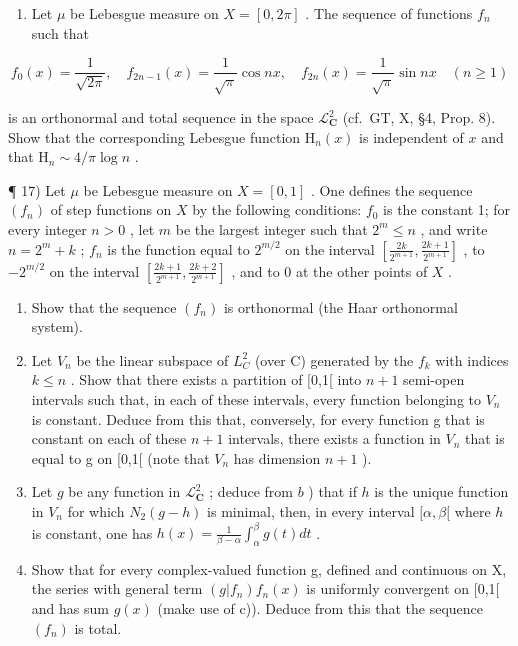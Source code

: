 \begin{enumerate}
\def\labelenumi{\arabic{enumi})}
\setcounter{enumi}{15}
\tightlist
\item
  Let \(\mu\) be Lebesgue measure on \(X = [0, 2\pi]\) . The sequence of functions \(f_n\) such that
\end{enumerate}

\[
f _ {0} (x) = \frac {1}{\sqrt {2 \pi}}, \quad f _ {2 n - 1} (x) = \frac {1}{\sqrt {\pi}} \cos n x, \quad f _ {2 n} (x) = \frac {1}{\sqrt {\pi}} \sin n x \quad (n \geqslant 1)
\]

is an orthonormal and total sequence in the space \(\mathcal{L}_{\mathbf{C}}^{2}\) (cf.~GT, X, §4, Prop. 8). Show that the corresponding Lebesgue function \(\mathrm{H}_n(x)\) is independent of \(x\) and that \(\mathrm{H}_n \sim 4 / \pi \log n\) .

¶ 17) Let \(\mu\) be Lebesgue measure on \(X = [0,1]\) . One defines the sequence \((f_n)\) of step functions on \(X\) by the following conditions: \(f_0\) is the constant 1; for every integer \(n > 0\) , let \(m\) be the largest integer such that \(2^m \leqslant n\) , and write \(n = 2^m + k\) ; \(f_n\) is the function equal to \(2^{m/2}\) on the interval \(\left[\frac{2k}{2^{m+1}}, \frac{2k+1}{2^{m+1}}\right]\) , to \(-2^{m/2}\) on the interval \(\left[\frac{2k+1}{2^{m+1}}, \frac{2k+2}{2^{m+1}}\right]\) , and to 0 at the other points of \(X\) .

\begin{enumerate}
\def\labelenumi{\alph{enumi})}
\item
  Show that the sequence \((f_n)\) is orthonormal (the Haar orthonormal system).
\item
  Let \(V_{n}\) be the linear subspace of \(L_{C}^{2}\) (over C) generated by the \(f_{k}\) with indices \(k \leqslant n\) . Show that there exists a partition of {[}0,1{[} into \(n+1\) semi-open intervals such that, in each of these intervals, every function belonging to \(V_{n}\) is constant. Deduce from this that, conversely, for every function g that is constant on each of these \(n+1\) intervals, there exists a function in \(V_{n}\) that is equal to g on {[}0,1{[} (note that \(V_{n}\) has dimension \(n+1\) ).
\item
  Let \(g\) be any function in \(\mathcal{L}_{\mathbf{C}}^2\) ; deduce from \(b\) ) that if \(h\) is the unique function in \(V_n\) for which \(N_2(g - h)\) is minimal, then, in every interval \([\alpha, \beta[\) where \(h\) is constant, one has \(h(x) = \frac{1}{\beta - \alpha} \int_{\alpha}^{\beta} g(t) dt\) .
\item
  Show that for every complex-valued function g, defined and continuous on X, the series with general term \((g|f_{n})f_{n}(x)\) is uniformly convergent on {[}0,1{[} and has sum \(g(x)\) (make use of c)). Deduce from this that the sequence \((f_{n})\) is total.
\end{enumerate}


